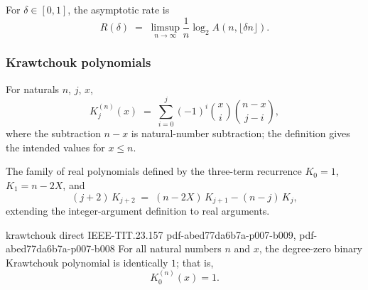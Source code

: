 \begin{definition}
\label{rate}
\leanok
{}
For $\delta \in [0,1]$, the asymptotic rate is
\[
  R(\delta) \;=\; \limsup_{n\to\infty} \frac{1}{n}\log_2 A(n, \lfloor \delta n \rfloor).
\]
\end{definition}

\subsubsection{Krawtchouk polynomials}

\begin{definition}
\label{krawtchouk}
\leanok
{}
For naturals $n$, $j$, $x$,
\[
  K_j^{(n)}(x) \;=\; \sum_{i=0}^{j} (-1)^i \binom{x}{i}\binom{n-x}{j-i},
\]
where the subtraction $n-x$ is natural-number subtraction; the definition gives the
intended values for $x \le n$.
\end{definition}

\begin{definition}
\label{krawtchoukPoly}
\leanok
{}
The family of real polynomials defined by the three-term recurrence
$K_0 = 1$, $K_1 = n - 2X$, and
\[
  (j+2)\,K_{j+2} \;=\; (n - 2X)\,K_{j+1} - (n-j)\,K_j,
\]
extending the integer-argument definition to real arguments.
\end{definition}

\begin{theorem}
\label{krawtchouk_zero}
\leanok
{}
\proofstep
  {krawtchouk}
  {direct}
  {IEEE-TIT.23.157}
  {pdf-abed77da6b7a-p007-b009,
    pdf-abed77da6b7a-p007-b008}
For all natural numbers $n$ and $x$, the degree-zero binary Krawtchouk polynomial is
identically $1$; that is,
\[
  K_0^{(n)}(x) = 1.
\]
\end{theorem}


